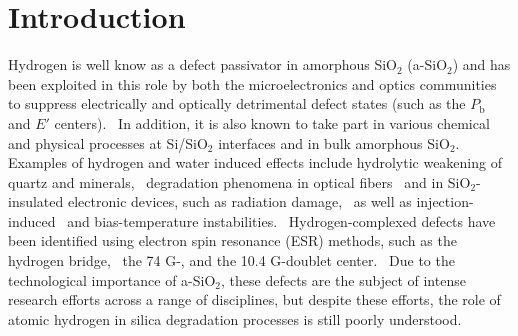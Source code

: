 \documentclass[aps,prb,reprint,superscriptaddress,showpacs]{revtex4-1}
\begin{document}
\maketitle

\section{Introduction}

Hydrogen is well know as a defect passivator in amorphous SiO$_2$ (a-SiO$_2$) and has been exploited in this role by both the microelectronics and optics communities to suppress electrically and optically detrimental defect states (such as the $P_\mathrm{b}$ and $E'$ centers).~\cite{LENAHAN08} In addition, it is also known to take part in various chemical and physical processes at Si/SiO$_2$ interfaces and in bulk amorphous SiO$_2$.~\cite{pobegen_h,cartier_depassivation,stathis_depassivation,hydrogen_ria,hydrogen_breakdown} Examples of hydrogen and water induced effects include hydrolytic weakening of quartz and minerals,~\cite{hobbs_h} degradation phenomena in optical fibers~\cite{griscom_fibers} and in SiO$_2$-insulated electronic devices, such as radiation damage,~\cite{revesz,mclean_radiation,griscom_radiation1} as well as injection-induced~\cite{dimaria_injection} and bias-temperature instabilities.~\cite{helms_bti,pobegen_h_nbti} Hydrogen-complexed defects have been identified using electron spin resonance (ESR) methods, such as the hydrogen bridge,~\cite{eprime_4_1,eprime_4_2} the 74 G-, and the 10.4 G-doublet center.~\cite{CONLEY92,LENAHAN08,kannan_hydrogen_epr} Due to the technological importance of a-SiO$_2$, these defects are the subject of intense research efforts across a range of disciplines, but despite these efforts, the role of atomic hydrogen in silica degradation processes is still poorly understood.
\end{document}
